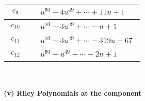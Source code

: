 \documentclass[1p]{elsarticle_modified}
\theoremstyle{definition}
\begin{document}
\begin{tabular}{m{50pt}|m{274pt}}
\hline $$\begin{aligned}c_{9}\end{aligned}$$&$\begin{aligned}
&u^{50}-4 u^{49}+\cdots+11 u+1
\end{aligned}$\\
\hline $$\begin{aligned}c_{10}\end{aligned}$$&$\begin{aligned}
&u^{50}-3 u^{49}+\cdots- u+1
\end{aligned}$\\
\hline $$\begin{aligned}c_{11}\end{aligned}$$&$\begin{aligned}
&u^{50}-3 u^{49}+\cdots-319 u+67
\end{aligned}$\\
\hline $$\begin{aligned}c_{12}\end{aligned}$$&$\begin{aligned}
&u^{50}- u^{49}+\cdots-2 u+1
\end{aligned}$\\
\hline
\end{tabular}\\~\\
\newpage\renewcommand{\arraystretch}{1}
\flushleft \textbf{(v) Riley Polynomials at the component}\newline \\
\end{document}
